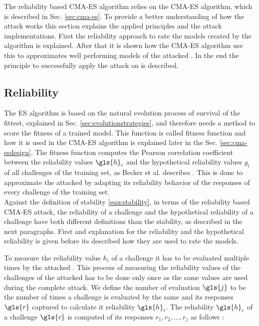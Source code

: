 The reliability based \ac{CMA-ES} algorithm relies on the \ac{CMA-ES} algorithm, which is described in Sec. \ref{sec:cma-es}.
To provide a better understanding of how the attack works this section explains the applied principles and the attack implementations.
First the reliability approach to rate the models created by the algorithm is explained.
After that it is shown how the \ac{CMA-ES} algorithm use this to approximates well performing models of the attacked \apuf.
In the end the principle to successfully apply the attack on \xpufs is described.


\subsection{Reliability}
\label{sec:reliability}

The \ac{ES} algorithm is based on the natural evolution process of survival of the fittest, explained in Sec. \ref{sec:evolutionstrategies}, and therefore needs a method to score the fitness of a trained model.
This function is called fitness function and how it is used in the \ac{CMA-ES} algorithm is explained later in the Sec. \ref{sec:cma-esdesign}.
The fitness function computes the Pearson correlation coefficient between the reliability values $\gls{h}_i$ and the hypothetical reliability values $g_i$ of all challenges of the training set, as Becker et al. describes \cite{Becker2015ThePUFs}.
This is done to approximate the attacked \puf by adapting its reliability behavior of the responses of every challenge of the training set.\\
Against the definition of stability \ref{equ:stability}, in terms of the reliability based \ac{CMA-ES} attack, the reliability of a challenge and the hypothetical reliability of a challenge have both different definitions than the stability, as described in the next paragraphs. 
First and explanation for the reliability and the hypothetical reliability is given before its described how they are used to rate the models.

To measure the reliability value $h_i$ of a challenge it has to be evaluated multiple times by the attacked \puf.
This process of measuring the reliability values of the challenges of the attacked \puf has to be done only once as the same values are used during the complete attack.
We define the number of evaluation $\gls{j}$ to be the number of times a challenge is evaluated by the same \puf and its responses $\gls{r}$ captured to calculate it reliability $\gls{h}_i$.
The reliability $\gls{h}_i$ of a challenge $\gls{c}$ is computed of its responses $r_1, r_2, ..., r_j$ as follows \cite{Becker2015ThePUFs}:

